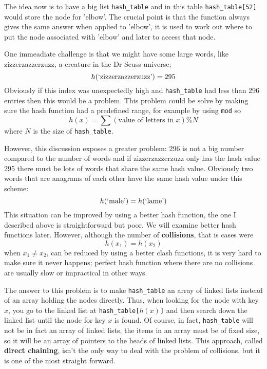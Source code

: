 \documentclass[11pt,a4paper]{scrartcl}
\begin{document}
The idea now is to have a big list \texttt{hash\_table} and in this
table \texttt{hash\_table[52]} would store the node for 'elbow'. The
crucial point is that the function always gives the same answer when
applied to 'elbow', it is used to work out where to put the node
associated with 'elbow' and later to access that node.

One immeadiate challenge is that we might have some large words, like
zizzerzazzerzuzz, a creature in the Dr Seuss universe;
\begin{equation}
h(\mbox{\lq{}zizzerzazzerzuzz\rq{}})=295
\end{equation}
Obviously if this index was unexpectedly high and \texttt{hash\_table}
had less than 296 entries then this would be a problem. This problem
could be solve by making sure the hash function had a predefined
range, for example by using \texttt{mod} so
\begin{equation}
h(x)=\sum{(\mbox{value of letters in }x)}\% N
\end{equation}
where $N$ is the size of \texttt{hash\_table}.

However, this discussion exposes a greater problem: 296 is not a big
number compared to the number of words and if zizzerzazzerzuzz only
has the hash value 295 there must be lots of words that share the same
hash value. Obviously two words that are anagrams of each other have
the same hash value under this scheme:
\begin{equation}
h(\mbox{\lq{}male\rq{}})=h(\mbox{\lq{}lame\rq{}})
\end{equation}
This situation can be improved by using a better hash function, the
one I described above is straightforward but poor. We will examine
better hash functions later. However, although the number of
\textbf{collisions}, that is cases were
\begin{equation}
h(x_1)=h(x_2)
\end{equation}
when $x_1\not=x_2$, can be reduced by using a better clash functions,
it is very hard to make sure it never happens; perfect hash function
where there are no collisions are usually slow or impractical in other
ways.

The answer to this problem is to make \texttt{hash\_table} an array of
linked lists instead of an array holding the nodes directly. Thus,
when looking for the node with key $x$, you go to the linked list at
\texttt{hash\_table[$h(x)$]} and then search down the linked list
until the node for key $x$ is found. Of course, in fact,
\texttt{hash\_table} will not be in fact an array of linked lists, the
items in an array must be of fixed size, so it will be an array of
pointers to the heads of linked lists. This approach, called
\textbf{direct chaining}, isn't the only way to deal with the problem
of collisions, but it is one of the most straight forward.
\end{document}
